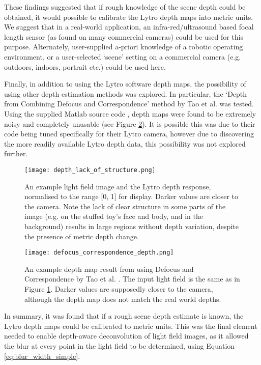 These findings suggested that if rough knowledge of the scene depth could be obtained, it would possible to calibrate the Lytro depth maps into metric units.
We suggest that in a real-world application, an infra-red/ultrasound based focal length sensor (as found on many commercial cameras) could be used for this purpose.
Alternately, user-supplied a-priori knowledge of a robotic operating environment, or a user-selected \enquote*{scene} setting on a commercial camera (e.g. outdoors, indoors, portrait etc.) could be used here.

Finally, in addition to using the Lytro software depth maps, the possibility of using other depth estimation methods was explored.
In particular, the \enquote*{Depth from Combining Defocus and Correspondence} method by Tao et al. \cite{tao2013depth} was tested.
Using the supplied Matlab source code \cite{tao2013depthwebsite}, depth maps were found to be extremely noisy and completely unusable (see Figure \ref{fig:defocus_correspondence_depth}).
It is possible this was due to their code being tuned specifically for their Lytro camera, however due to discovering the more readily available Lytro depth data, this possibility was not explored further.

\begin{figure}[p]
\centering
\texttt{[image: depth\_lack\_of\_structure.png]}
\caption[Lack of Scene Structure Corrupts Lytro Depth Estimation]{
An example light field image and the Lytro depth response, normalised to the range [0, 1] for display.
Darker values are closer to the camera.
Note the lack of clear structure in some parts of the image (e.g. on the stuffed toy's face and body, and in the background) results in large regions without depth variation, despite the presence of metric depth change.
}
\label{fig:depth_lack_of_structure}
\end{figure}

\begin{figure}[p]
\centering
\texttt{[image: defocus\_correspondence\_depth.png]}
\caption[Depth Map from combining Defocus and Correspondence]{
An example depth map result from using Defocus and Correspondence by Tao et al. \cite{tao2013depthwebsite}.
The input light field is the same as in Figure \ref{fig:depth_lack_of_structure}.
Darker values are supposedly closer to the camera, although the depth map does not match the real world depths.
}
\label{fig:defocus_correspondence_depth}
\end{figure}


In summary, it was found that if a rough scene depth estimate is known, the Lytro depth maps could be calibrated to metric units.
This was the final element needed to enable depth-aware deconvolution of light field images, as it allowed the blur at every point in the light field to be determined, using Equation \ref{eq:blur_width_simple}.

